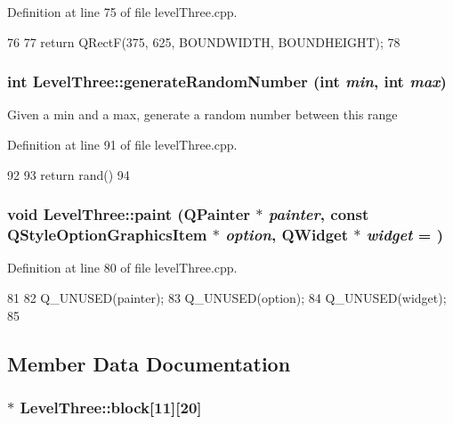 Definition at line 75 of file levelThree.cpp.


\begin{DoxyCode}
76 {
77     return QRectF(375, 625, BOUNDWIDTH, BOUNDHEIGHT);
78 }
\end{DoxyCode}
\hypertarget{class_level_three_aa24bdff687183528fa201cdcbf191e33}{
\subsubsection[{generateRandomNumber}]{\setlength{\rightskip}{0pt plus 5cm}int LevelThree::generateRandomNumber (int {\em min}, \/  int {\em max})}}
\label{class_level_three_aa24bdff687183528fa201cdcbf191e33}
Given a min and a max, generate a random number between this range 

Definition at line 91 of file levelThree.cpp.


\begin{DoxyCode}
92 {
93     return rand() %
94 }
\end{DoxyCode}
\hypertarget{class_level_three_ae0252fbf12113d716253572d25292e28}{
\subsubsection[{paint}]{\setlength{\rightskip}{0pt plus 5cm}void LevelThree::paint (QPainter $\ast$ {\em painter}, \/  const QStyleOptionGraphicsItem $\ast$ {\em option}, \/  QWidget $\ast$ {\em widget} = {})}}
\label{class_level_three_ae0252fbf12113d716253572d25292e28}


Definition at line 80 of file levelThree.cpp.


\begin{DoxyCode}
81 {
82     Q_UNUSED(painter);
83     Q_UNUSED(option);
84     Q_UNUSED(widget);
85 }
\end{DoxyCode}


\subsection{Member Data Documentation}
\hypertarget{class_level_three_a937d4711d32721bf7b0a6d30b9766368}{
\subsubsection[{block}]{$\ast$ {\bf LevelThree::block}\mbox{[}11\mbox{]}\mbox{[}20\mbox{]}}}
\label{class_level_three_a937d4711d32721bf7b0a6d30b9766368}


